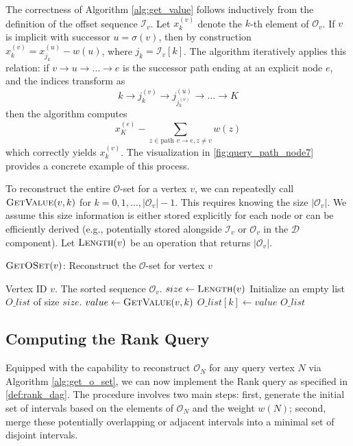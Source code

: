 The correctness of Algorithm \ref{alg:get_value} follows inductively from the definition of the offset sequence $\mathcal{I}_v$. Let $x_k^{(v)}$ denote the $k$-th element of $\mathcal{O}_v$. If $v$ is implicit with successor $u = \sigma(v)$, then by construction $x_k^{(v)} = x_{j_k}^{(u)} - w(u)$, where $j_k = \mathcal{I}_v[k]$. The algorithm iteratively applies this relation: if $v \to u \to \dots \to e$ is the successor path ending at an explicit node $e$, and the indices transform as
\[ k \to j_k^{(v)} \to j_{j_k^{(v)}}^{(u)} \to \dots \to K \]
then the algorithm computes
\[x_K^{(e)} - \sum_{z \in \text{path } v \to e, z \neq v} w(z)\]
which correctly yields $x_k^{(v)}$. The visualization in \autoref{fig:query_path_node7} provides a concrete example of this process.

To reconstruct the entire $\mathcal{O}$-set for a vertex $v$, we can repeatedly call $\textsc{GetValue}(v, k)$ for $k=0, 1, \dots, |\mathcal{O}_v|-1$. This requires knowing the size $|\mathcal{O}_v|$. We assume this size information is either stored explicitly for each node or can be efficiently derived (e.g., potentially stored alongside $\mathcal{I}_v$ or $\mathcal{O}_v$ in the $\mathcal{D}$ component). Let $\textsc{Length}(v)$ be an operation that returns $|\mathcal{O}_v|$.

\begin{algorithm}
    \caption{$\textsc{GetOSet}(v)$: Reconstruct the $\mathcal{O}$-set for vertex $v$}
    \label{alg:get_o_set}
    \small
    \begin{algorithmic}[1]
        \Require Vertex ID $v$.
        \Ensure The sorted sequence $\mathcal{O}_v$.
        \State $size \gets \textsc{Length}(v)$ 
        \State Initialize an empty list $O\_list$ of size $size$.
        \State $value \gets \textsc{GetValue}(v, k)$ 
        \State $O\_list[k] \gets value$ 
        \EndFor
        \State \Return $O\_list$ 
    \end{algorithmic}
\end{algorithm}

\subsection{Computing the Rank Query}
\label{subsec:computing_rank}

Equipped with the capability to reconstruct $\mathcal{O}_N$ for any query vertex $N$ via Algorithm \ref{alg:get_o_set}, we can now implement the Rank query as specified in \ref{def:rank_dag}. The procedure involves two main steps: first, generate the initial set of intervals based on the elements of $\mathcal{O}_N$ and the weight $w(N)$; second, merge these potentially overlapping or adjacent intervals into a minimal set of disjoint intervals.

